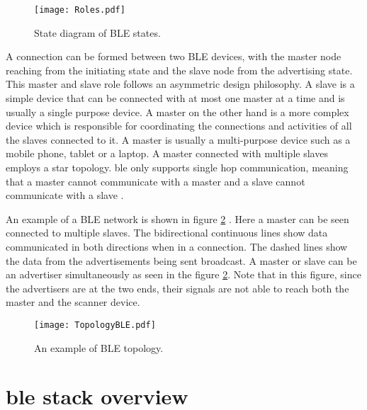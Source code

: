 \begin{figure}[!b] %
\centering

\texttt{[image: Roles.pdf]}
\vspace{-5pt}
\caption{State diagram of BLE states.}
\label{fig:Roles}
\vspace{-10pt}
\end{figure}

A connection can be formed between two BLE devices, with the master node reaching from the initiating state and the slave node from the advertising state. This master and slave role follows an asymmetric design philosophy. A slave is a simple device that can be connected with at most one master at a time and is usually a single purpose device. A master on the other hand is a more complex device which is responsible for coordinating the connections and activities of all the slaves connected to it. A master is usually a multi-purpose device such as a mobile phone, tablet or a laptop. A master connected with multiple slaves employs a star topology. \gls{ble} only supports single hop communication, meaning that a master cannot communicate with a master and a slave cannot communicate with a slave \cite{BLE101}.

An example of a BLE network is shown in figure \ref{fig:TopoBLE} \cite{BLE101}. Here a master can be seen connected to multiple slaves. The bidirectional continuous lines show data communicated in both directions when in a connection. The dashed lines show the data from the advertisements being sent broadcast. A master or slave can be an advertiser simultaneously as seen in the figure \ref{fig:TopoBLE}. Note that in this figure, since the advertisers are at the two ends, their signals are not able to reach both the master and the scanner device.

\begin{figure}[t]
\centering
\texttt{[image: TopologyBLE.pdf]}
\caption{An example of BLE topology.}
\label{fig:TopoBLE}
\vspace{-10pt}
\end{figure}

\section[\texorpdfstring{\gls{ble}}{BLE} Stack Overview]{\texorpdfstring{\gls{ble}}{BLE} stack overview}

